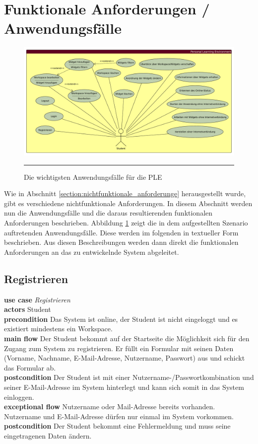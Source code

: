 \section{Funktionale Anforderungen / Anwendungsfälle}\label{section:anwendungsfaelle}
\begin{figure}[hb]
  \centering
  \includegraphics[width=\textwidth,height=\textheight,keepaspectratio]{./Figures/anwendungsfaelle_quer.pdf}
    \rule{35em}{0.5pt}
  \caption[Anwendungsfälle der PLE]{Die wichtigsten Anwendungsfälle für die PLE}
  \label{fig:anwendungsfaelle}
\end{figure}

Wie in Abschnitt \ref{section:nichtfunktionale_anforderunge} herausgestellt wurde, gibt es verschiedene nichtfunktionale Anforderungen. In diesem Abschnitt werden nun die Anwendungsfälle und die daraus resultierenden funktionalen Anforderungen beschrieben. Abbildung \ref{fig:anwendungsfaelle} zeigt die in dem aufgestellten Szenario auftretenden Anwendungsfälle. Diese werden im folgenden in textueller Form beschrieben. Aus diesen Beschreibungen werden dann direkt die funktionalen Anforderungen an das zu entwickelnde System abgeleitet.

\subsection{Registrieren}
\textbf{use case} \emph{Registrieren}\\
\textbf{actors} Student\\
\textbf{precondition} Das System ist online, der Student ist nicht eingeloggt und es existiert mindestens ein Workspace.\\
\textbf{main flow} Der Student bekommt auf der Startseite die Möglichkeit sich für den Zugang zum System zu registrieren. Er füllt ein Formular mit seinen Daten (Vorname, Nachname, E-Mail-Adresse, Nutzername, Passwort) aus und schickt das Formular ab.\\
\textbf{postcondition} Der Student ist mit einer Nutzername-/Passwortkombination und seiner E-Mail-Adresse im System hinterlegt und kann sich somit in das System einloggen.\\
\textbf{exceptional flow} Nutzername oder Mail-Adresse bereits vorhanden. Nutzername und E-Mail-Adresse dürfen nur einmal im System vorkommen.\\
\textbf{postcondition} Der Student bekommt eine Fehlermeldung und muss seine eingetragenen Daten ändern.
 
